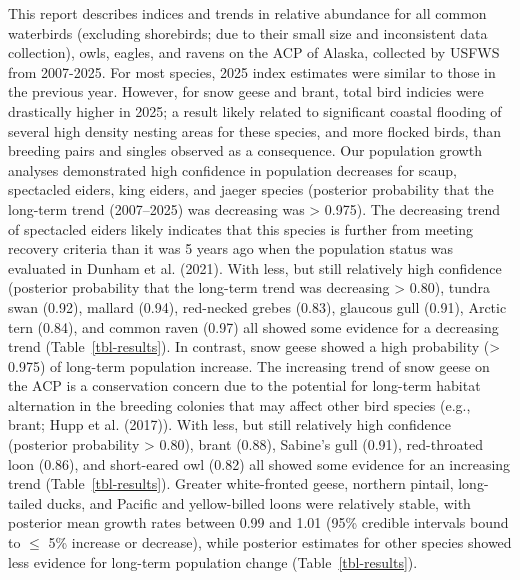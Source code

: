 \documentclass[
]{article}
\begin{document}
This report describes indices and trends in relative abundance for all
common waterbirds (excluding shorebirds; due to their small size and
inconsistent data collection), owls, eagles, and ravens on the ACP of
Alaska, collected by USFWS from 2007-2025. For most species, 2025 index
estimates were similar to those in the previous year. However, for snow
geese and brant, total bird indicies were drastically higher in 2025; a
result likely related to significant coastal flooding of several high
density nesting areas for these species, and more flocked birds, than
breeding pairs and singles observed as a consequence. Our population
growth analyses demonstrated high confidence in population decreases for
scaup, spectacled eiders, king eiders, and jaeger species (posterior
probability that the long-term trend (2007--2025) was decreasing was
\textgreater{} 0.975). The decreasing trend of spectacled eiders likely
indicates that this species is further from meeting recovery criteria
than it was 5 years ago when the population status was evaluated in
Dunham et al. (2021). With less, but still relatively high confidence
(posterior probability that the long-term trend was decreasing
\textgreater{} 0.80), tundra swan (0.92), mallard (0.94), red-necked
grebes (0.83), glaucous gull (0.91), Arctic tern (0.84), and common
raven (0.97) all showed some evidence for a decreasing trend
(Table~\ref{tbl-results}). In contrast, snow geese showed a high
probability (\textgreater{} 0.975) of long-term population increase. The
increasing trend of snow geese on the ACP is a conservation concern due
to the potential for long-term habitat alternation in the breeding
colonies that may affect other bird species (e.g., brant; Hupp et al.
(2017)). With less, but still relatively high confidence (posterior
probability \textgreater{} 0.80), brant (0.88), Sabine's gull (0.91),
red-throated loon (0.86), and short-eared owl (0.82) all showed some
evidence for an increasing trend (Table~\ref{tbl-results}). Greater
white-fronted geese, northern pintail, long-tailed ducks, and Pacific
and yellow-billed loons were relatively stable, with posterior mean
growth rates between 0.99 and 1.01 (95\% credible intervals bound to
\(\leq\) 5\% increase or decrease), while posterior estimates for other
species showed less evidence for long-term population change
(Table~\ref{tbl-results}).
\end{document}
